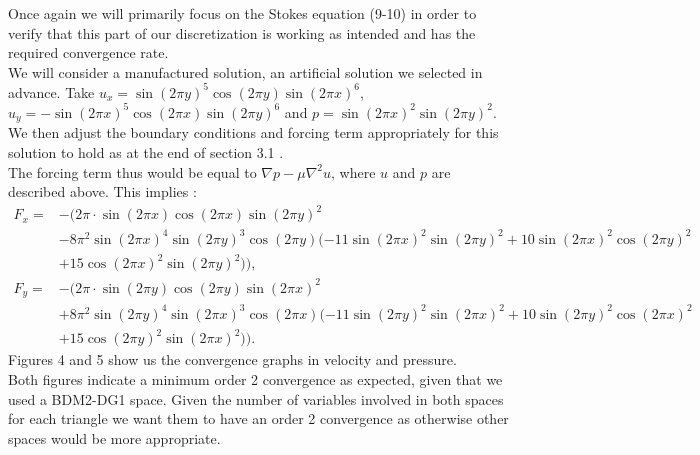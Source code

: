\documentclass[11pt,twoside,a4paper]{article}
\begin{document}
Once again we will primarily focus on the Stokes equation (9-10) in order to verify that this part of our discretization is working as intended and has the required convergence rate.\\
We will consider a manufactured solution, an artificial solution we selected in advance. Take $u_x = \sin(2 \pi y)^5 \cos(2 \pi y)\sin(2 \pi x)^6$, $u_y= -\sin(2 \pi x)^5 \cos(2 \pi x) \sin(2 \pi y)^6$ and $p = \sin(2 \pi x)^2 \sin(2 \pi y)^2$.\\
We then adjust the boundary conditions and forcing term appropriately for this solution to hold as at the end of section 3.1 .\\
The forcing term thus would be equal to $\nabla p - \mu \nabla^2 u$, where $u$ and $p$ are described above. This implies :
\begin{align*}
F_x =& -(2 \pi \cdot \sin( 2 \pi x) \cos(2 \pi x) \sin(2 \pi y)^2 \\
	&- 8 \pi^2 \sin(2 \pi x)^4 \sin(2 \pi y)^3 \cos(2 \pi y)(-11 \sin(2 \pi x)^2 \sin(2 \pi y)^2 + 10 \sin(2 \pi x)^2 \cos(2 \pi y)^2 \\
	& + 15 \cos(2 \pi x)^2 \sin(2 \pi y)^2 )),\\
F_y = &-(2 \pi \cdot \sin( 2 \pi y) \cos(2 \pi y) \sin(2 \pi x)^2 \\
	&+ 8 \pi^2 \sin(2 \pi y)^4 \sin(2 \pi x)^3 \cos(2 \pi x)(-11 \sin(2 \pi y)^2 \sin(2 \pi x)^2 + 10 \sin(2 \pi y)^2 \cos(2 \pi x)^2 \\
	&+ 15 \cos(2 \pi y)^2 \sin(2 \pi x)^2 )).
\end{align*}
Figures 4 and 5 show us the convergence graphs in velocity and pressure.\\
Both figures indicate a minimum order 2 convergence as expected, given that we used a BDM2-DG1 space. Given the number of variables involved in both spaces for each triangle we want them to have an order 2 convergence as otherwise other spaces would be more appropriate.
\\
\end{document}
